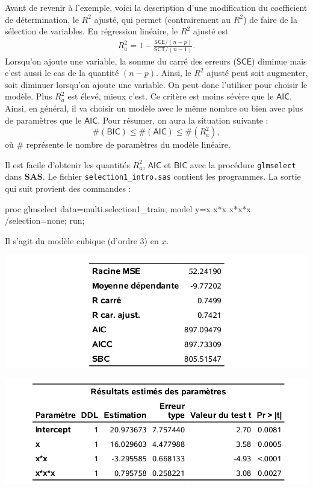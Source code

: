 \documentclass[
  11pt,
  letterpaper,
]{book}
\newenvironment{Shaded}{\begin{snugshade}}{\end{snugshade}}
\newcommand{\NormalTok}[1]{#1}
\theoremstyle{definition}
\theoremstyle{definition}
\theoremstyle{definition}
\theoremstyle{definition}
\theoremstyle{remark}
\begin{document}
Avant de revenir à l'exemple, voici la description d'une modification du coefficient de détermination, le \(R^2\) ajusté, qui permet (contrairement au \(R^2\)) de faire de la sélection de variables. En régression linéaire, le \(R^2\) ajusté est
\begin{align*}
R^2_a=1-\frac{\mathsf{SCE}/(n-p)}{\mathsf{SCT}/(n-1)}.
\end{align*}
Lorsqu'on ajoute une variable, la somme du carré des erreurs (\(\mathsf{SCE}\)) diminue mais c'est aussi le cas de la quantité \((n-p)\). Ainsi, le \(R^2\) ajusté peut soit augmenter, soit diminuer lorsqu'on ajoute une variable. On peut donc l'utiliser pour choisir le modèle. Plus \(R^2_a\) est élevé, mieux c'est. Ce critère est moins sévère que le \(\mathsf{AIC}\), Ainsi, en général, il va choisir un modèle avec le même nombre ou bien avec plus de paramètres que le \(\mathsf{AIC}\). Pour résumer, on aura la situation suivante :
\[ \#(\mathsf{BIC}) \leq \#(\mathsf{AIC}) \leq \#(R^2_a),\]
où \(\#\) représente le nombre de paramètres du modèle linéaire.

Il est facile d'obtenir les quantités \(R^2_a\), \(\mathsf{AIC}\) et \(\mathsf{BIC}\) avec la procédure \texttt{glmselect} dans \textbf{SAS}. Le fichier \texttt{selection1\_intro.sas} contient les programmes. La sortie qui suit provient des commandes :

\begin{Shaded}
\begin{Highlighting}[]
\NormalTok{proc glmselect data=multi.selection1\_train;}
\NormalTok{model y=x x*x x*x*x /selection=none;}
\NormalTok{run;}
\end{Highlighting}
\end{Shaded}

Il s'agit du modèle cubique (d'ordre 3) en \(x\).

\begin{center}\includegraphics[width=0.7\linewidth]{figures/02-select-e1} \end{center}

\begin{center}\includegraphics[width=0.7\linewidth]{figures/02-select-e2} \end{center}
\end{document}

